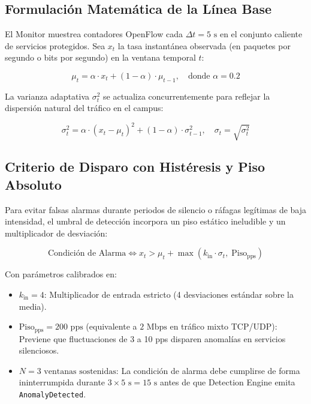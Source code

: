 \documentclass[11pt,a4paper]{report}
\begin{document}
\subsection{Formulación Matemática de la Línea Base}
El Monitor muestrea contadores OpenFlow cada $\Delta t = 5\text{ s}$ en el conjunto caliente de servicios protegidos. Sea $x_t$ la tasa instantánea observada (en paquetes por segundo o bits por segundo) en la ventana temporal $t$:

\begin{equation}
\mu_t = \alpha \cdot x_t + (1 - \alpha) \cdot \mu_{t-1}, \quad \text{donde } \alpha = 0.2
\end{equation}

La varianza adaptativa $\sigma_t^2$ se actualiza concurrentemente para reflejar la dispersión natural del tráfico en el campus:

\begin{equation}
\sigma_t^2 = \alpha \cdot (x_t - \mu_t)^2 + (1 - \alpha) \cdot \sigma_{t-1}^2, \quad \sigma_t = \sqrt{\sigma_t^2}
\end{equation}

\subsection{Criterio de Disparo con Histéresis y Piso Absoluto}
Para evitar falsas alarmas durante periodos de silencio o ráfagas legítimas de baja intensidad, el umbral de detección incorpora un piso estático ineludible y un multiplicador de desviación:

\begin{equation}
\text{Condición de Alarma} \iff x_t > \mu_t + \max\left(k_{\text{in}} \cdot \sigma_t, \; \text{Piso}_{\text{pps}}\right)
\end{equation}

Con parámetros calibrados en:
\begin{itemize}
    \item $k_{\text{in}} = 4$: Multiplicador de entrada estricto (4 desviaciones estándar sobre la media).
    \item $\text{Piso}_{\text{pps}} = 200\text{ pps}$ (equivalente a $2\text{ Mbps}$ en tráfico mixto TCP/UDP): Previene que fluctuaciones de 3 a 10 pps disparen anomalías en servicios silenciosos.
    \item $N = 3\text{ ventanas sostenidas}$: La condición de alarma debe cumplirse de forma ininterrumpida durante $3 \times 5\text{ s} = 15\text{ s}$ antes de que Detection Engine emita \texttt{AnomalyDetected}.
\end{itemize}
\end{document}
